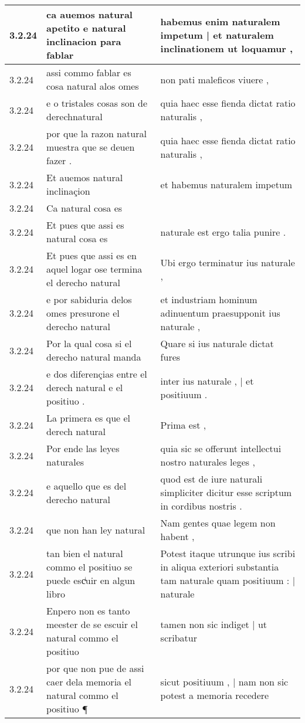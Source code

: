 \begin{tabular}{|p{1cm}|p{6.5cm}|p{6.5cm}|}
3.2.24 & ca auemos natural apetito e natural inclinacion para fablar & habemus enim naturalem impetum | et naturalem inclinationem ut loquamur , \\\hline
3.2.24 & assi commo fablar es cosa natural alos omes & non pati maleficos viuere , \\\hline
3.2.24 & e o tristales cosas son de derechnatural & quia haec esse fienda dictat ratio naturalis , \\\hline
3.2.24 & por que la razon natural muestra que se deuen fazer . & quia haec esse fienda dictat ratio naturalis , \\\hline
3.2.24 & Et auemos natural inclinaçion & et habemus naturalem impetum \\\hline
3.2.24 & Ca natural cosa es &  \\\hline
3.2.24 & Et pues que assi es natural cosa es & naturale est ergo talia punire . \\\hline
3.2.24 & Et pues que assi es en aquel logar ose termina el derecho natural & Ubi ergo terminatur ius naturale , \\\hline
3.2.24 & e por sabiduria delos omes presurone el derecho natural & et industriam hominum adinuentum praesupponit ius naturale , \\\hline
3.2.24 & Por la qual cosa si el derecho natural manda & Quare si ius naturale dictat fures \\\hline
3.2.24 & e dos diferençias entre el derech natural e el positiuo . & inter ius naturale , | et positiuum . \\\hline
3.2.24 & La primera es que el derech natural & Prima est , \\\hline
3.2.24 & Por ende las leyes naturales & quia sic se offerunt intellectui nostro naturales leges , \\\hline
3.2.24 & e aquello que es del derecho natural & quod est de iure naturali simpliciter dicitur esse scriptum in cordibus nostris . \\\hline
3.2.24 & que non han ley natural & Nam gentes quae legem non habent , \\\hline
3.2.24 & tan bien el natural commo el positiuo se puede escͥuir en algun libro & Potest itaque utrunque ius scribi in aliqua exteriori substantia tam naturale quam positiuum : | naturale \\\hline
3.2.24 & Enpero non es tanto meester de se escuir el natural commo el positiuo & tamen non sic indiget | ut scribatur \\\hline
3.2.24 & por que non pue de assi caer dela memoria el natural commo el positiuo ¶ & sicut positiuum , | nam non sic potest a memoria recedere \\\hline

\end{tabular}
